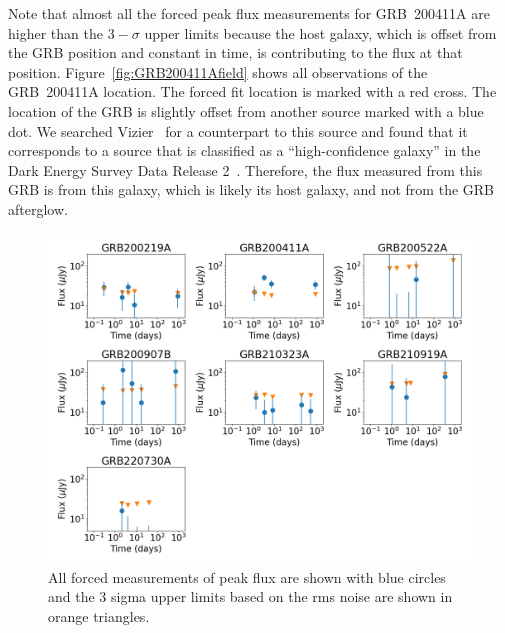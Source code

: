 \documentclass[12pt]{article}
\begin{document}
Note that almost all the forced peak flux measurements for GRB~200411A are higher than the $3-\sigma$ upper limits because the host galaxy, which is offset from the GRB position and constant in time, is contributing to the flux at that position. Figure~\ref{fig:GRB200411Afield} shows all observations of the GRB~200411A location. The forced fit location is marked with a red cross. The location of the GRB is slightly offset from another source marked with a blue dot. We searched Vizier~\citep{vizier} for a counterpart to this source and found that it corresponds to a source that is classified as a ``high-confidence galaxy'' in the Dark Energy Survey Data Release 2~\citep{Abbott_2021}. Therefore, the flux measured from this GRB is from this galaxy, which is likely its host galaxy, and not from the GRB afterglow.





\begin{figure}
	\includegraphics[width=\textwidth]{plotboth.png}
	\caption{All forced measurements of peak flux are shown with blue circles and the 3 sigma upper limits based on the rms noise are shown in orange triangles.}
	\label{fig:allmeasurements}
\end{figure}
\end{document}
